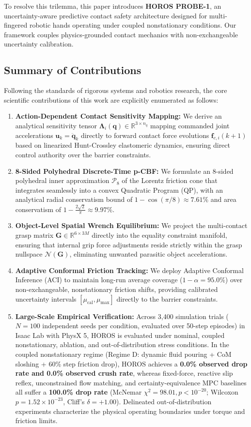 To resolve this trilemma, this paper introduces \textbf{HOROS PROBE-1}, an uncertainty-aware predictive contact safety architecture designed for multi-fingered robotic hands operating under coupled nonstationary conditions. Our framework couples physics-grounded contact mechanics with non-exchangeable uncertainty calibration.

\subsection{Summary of Contributions}
Following the standards of rigorous systems and robotics research, the core scientific contributions of this work are explicitly enumerated as follows:
\begin{enumerate}
    \item \textbf{Action-Dependent Contact Sensitivity Mapping:} We derive an analytical sensitivity tensor $\mathbf{\Lambda}_i(\mathbf{q}) \in \mathbb{R}^{3 \times n_q}$ mapping commanded joint accelerations $\mathbf{u}_k = \ddot{\mathbf{q}}_k$ directly to forward contact force evolutions $\mathbf{f}_{c, i}(k+1)$ based on linearized Hunt-Crossley elastomeric dynamics, ensuring direct control authority over the barrier constraints.
    \item \textbf{8-Sided Polyhedral Discrete-Time p-CBF:} We formulate an 8-sided polyhedral inner approximation $\mathcal{P}_8$ of the Lorentz friction cone that integrates seamlessly into a convex Quadratic Program (QP), with an analytical radial conservatism bound of $1 - \cos(\pi/8) \approx 7.61\%$ and area conservatism of $1 - \frac{2\sqrt{2}}{\pi} \approx 9.97\%$.
    \item \textbf{Object-Level Spatial Wrench Equilibrium:} We project the multi-contact grasp matrix $\mathbf{G} \in \mathbb{R}^{6 \times 3M}$ directly into the equality constraint manifold, ensuring that internal grip force adjustments reside strictly within the grasp nullspace $\mathcal{N}(\mathbf{G})$, eliminating unwanted parasitic object accelerations.
    \item \textbf{Adaptive Conformal Friction Tracking:} We deploy Adaptive Conformal Inference (ACI) to maintain long-run average coverage ($1 - \alpha = 95.0\%$) over non-exchangeable, nonstationary friction shifts, providing calibrated uncertainty intervals $[\mu_{\text{cal}}, \mu_{\max}]$ directly to the barrier constraints.
    \item \textbf{Large-Scale Empirical Verification:} Across 3,400 simulation trials ($N = 100$ independent seeds per condition, evaluated over 50-step episodes) in Isaac Lab with PhysX 5, HOROS is evaluated under nominal, coupled nonstationary, ablation, and out-of-distribution stress conditions. In the coupled nonstationary regime (Regime D: dynamic fluid pouring + CoM sloshing + 60\% step friction drop), HOROS achieves a \textbf{0.0\% observed drop rate and 0.0\% observed crush rate}, whereas fixed-force, reactive slip reflex, unconstrained flow matching, and certainty-equivalence MPC baselines all suffer a \textbf{100.0\% drop rate} (McNemar $\chi^2 = 98.01, p < 10^{-20}$; Wilcoxon $p = 1.52 \times 10^{-23}$, Cliff's $\delta = +1.00$). Delineated out-of-distribution experiments characterize the physical operating boundaries under torque and friction limits.

\end{enumerate}

